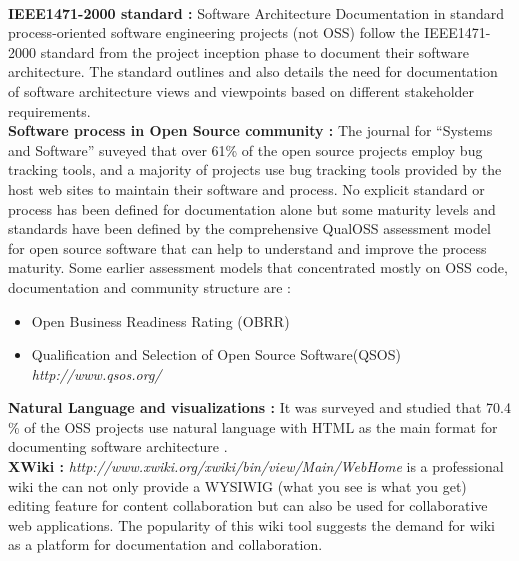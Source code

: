 \newline
\\\indent \textbf{IEEE1471-2000 standard : }Software Architecture Documentation in standard process-oriented software engineering projects (not OSS) follow the IEEE1471-2000 standard \cite{BachmannDocumentingSoftware2010} from the project inception phase to document their software architecture. The standard outlines and also details the need for documentation of software architecture views and viewpoints based on different stakeholder requirements.
\newline
\\\indent \textbf{Software process in Open Source community : } The journal for \enquote{Systems and Software} \cite{Zhao2003} suveyed that over 61\% of the open source projects employ bug tracking tools, and a majority of projects use bug tracking tools provided by the host web sites to maintain their software and process. No explicit standard or process has been defined for documentation alone but some maturity levels and standards have been defined by the comprehensive QualOSS assessment model \cite{5314237}for open source software that can help to understand and improve the process maturity. Some earlier assessment models that concentrated mostly on OSS code, documentation and community structure are :
\begin{itemize}
\item Open Business Readiness Rating (OBRR)\cite{Golden2006}
\item Qualification and Selection of Open Source Software(QSOS) \emph{http://www.qsos.org/}
\end{itemize}
\indent \textbf{Natural Language and visualizations : } It was surveyed and studied that 70.4 \% of the OSS projects use natural language with HTML as the main format for documenting software architecture \cite{6923128}. 
\newline
\\\indent \textbf{XWiki : } \emph{http://www.xwiki.org/xwiki/bin/view/Main/WebHome} is a professional wiki the can not only provide a WYSIWIG (what you see is what you get) editing feature for content collaboration but can also be used for collaborative web applications. The popularity of this wiki tool suggests the demand for wiki as a platform for documentation and collaboration.

